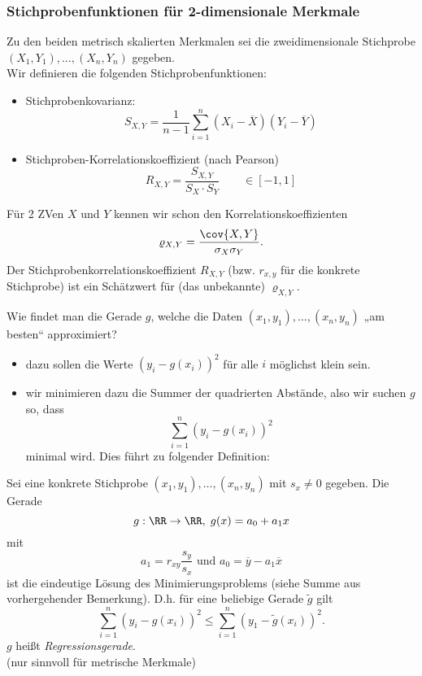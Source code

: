 \documentclass{scrreprt}
\begin{document}
\subsubsection{Stichprobenfunktionen für 2-dimensionale Merkmale}

 Zu den beiden metrisch skalierten Merkmalen sei die zweidimensionale Stichprobe $(X_1,Y_1),\ldots, (X_n, Y_n)$ gegeben.\\
Wir definieren die folgenden Stichprobenfunktionen:
\begin{itemize}
\item Stichprobenkovarianz:
$$S_{X,Y}=\frac{1}{n-1}\sum_{i=1}^n(X_i - \overline{X})(Y_i-\overline{Y})$$
\item Stichproben-Korrelationskoeffizient (nach Pearson)
$$R_{X,Y}=\frac{S_{X,Y}}{S_X\cdot S_Y} \qquad \in [-1,1]$$
\end{itemize}

 Für 2 ZVen $X$ und $Y$ kennen wir schon den Korrelationskoeffizienten
$$\varrho_{X,Y}=\frac{\cov{X,Y}}{\sigma_X \sigma_Y}\text{.}$$
Der Stichprobenkorrelationskoeffizient $R_{X,Y}$ (bzw. $r_{x,y}$ für die konkrete Stichprobe) ist ein Schätzwert für (das unbekannte) $\varrho_{X,Y}$.\bigskip

Wie findet man die Gerade $g$, welche die Daten $(x_1,y_1), \ldots, (x_n, y_n)$ „am besten“ approximiert?
\begin{itemize}
\item dazu sollen die Werte $(y_i-g(x_i))^2$ für alle $i$ möglichst klein sein.\\
\item wir minimieren dazu die Summer der quadrierten Abstände, also wir suchen $g$ so, dass 
$$\sum_{i=1}^n (y_i-g(x_i))^2$$
minimal wird. Dies führt zu folgender Definition:
\end{itemize}
 Sei eine konkrete Stichprobe $(x_1,y_1),\ldots, (x_n,y_n)$ mit $s_x\not = 0$ gegeben. Die Gerade 
$$g: \RR\to \RR, \; g(x)=a_0+a_1x$$
mit
$$a_1 = r_{xy}\frac{s_y}{s_x} \text{ und } a_0 = \overline{y} - a_1 \overline{x}$$
ist die eindeutige Lösung des Minimierungsproblems (siehe Summe aus vorhergehender Bemerkung). D.h. für eine beliebige Gerade $\tilde{g}$ gilt
$$\sum_{i=1}^n (y_i - g(x_i))^2 \leq \sum_{i=1}^n(y_1 - \tilde{g}(x_i))^2 \text{.}$$
$g$ heißt \emph{Regressionsgerade}.\\
(nur sinnvoll für metrische Merkmale)
\end{document}
